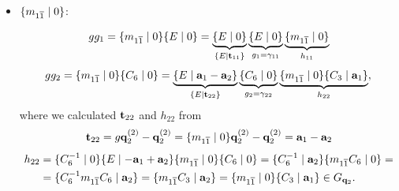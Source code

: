 \begin{itemize}
%


\item $\{m_{1\overline{1}} \mid 0\}$:

\begin{equation} \label{eq:spinful_graphene_generator_C6_g1_decomp}
gg_1 = \{m_{1\overline{1}} \mid 0\} \{E \mid 0\} = \underbrace{\{E \mid 0\}}_{\{E\mid{\vb{t}}_{11}\}} \underbrace{\{E \mid 0\}}_{g_1 = \gamma_{11}} \underbrace{\{m_{1\overline{1}} \mid 0\}}_{h_{11}}
\end{equation}
\begin{equation} \label{eq:spinful_graphene_generator_C6_g2_decomp}
gg_2 = \{m_{1\overline{1}} \mid 0\} \{C_6 \mid 0\} = \underbrace{\{E \mid {\vb{a}}_1-{\vb{a}}_2\}}_{\{E\mid {\vb{t}}_{22}\}} \underbrace{\{C_6\mid 0\}}_{g_2 = \gamma_{22}} \underbrace{\{ m_{1\overline{1}} \mid 0 \} \{C_3\mid{\vb{a}}_1\}}_{h_{22}},
\end{equation}
where we calculated ${\vb{t}}_{22}$ and $h_{22}$ from
$$
{\vb{t}}_{22} = g {\vb{q}}_2^{(2)} - {\vb{q}}_2^{(2)} = \{m_{1\overline{1}} \mid 0\} {\vb{q}}_2^{(2)} - {\vb{q}}_2^{(2)} = {\vb{a}}_1-{\vb{a}}_2
$$
\begin{align} \label{eq:spinful_graphene_generator_C6_g2_decomp_h}
h_{22} &= \{C_6^{-1}\mid 0\} \{E \mid -{\vb{a}}_1+{\vb{a}}_2\} \{m_{1\overline{1}} \mid 0\} \{C_6 \mid 0\} =
\{C_6^{-1} \mid {\vb{a}}_2 \}\{m_{1\overline{1}} C_6 \mid 0\} = \\
&= \{C_6^{-1} m_{1\overline{1}} C_6 \mid {\vb{a}}_2\} = \{ m_{1\overline{1}} C_3 \mid {\vb{a}}_2 \} = \{ m_{1\overline{1}} \mid 0 \} \{C_3\mid{\vb{a}}_1\} \in G_{{\vb{q}}_2}.
\end{align}


\end{itemize}
